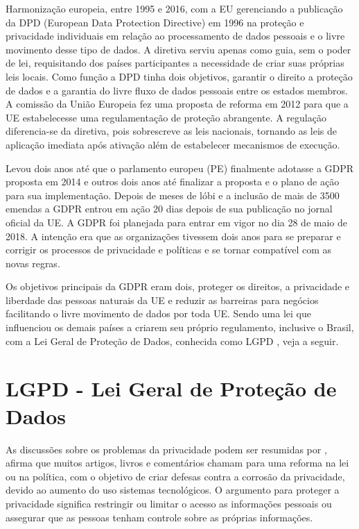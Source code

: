 Harmonização europeia, entre 1995 e 2016, com a EU gerenciando a publicação da DPD (European Data Protection Directive) em 1996 na proteção e privacidade individuais em relação ao processamento de dados pessoais e o livre movimento desse tipo de dados. A diretiva serviu apenas como guia, sem o poder de lei, requisitando dos países participantes a necessidade de criar suas próprias leis locais. Como função a DPD tinha dois objetivos, garantir o direito a proteção de dados e a garantia do livre fluxo de dados pessoais entre os estados membros. A comissão da União Europeia fez uma proposta de reforma em 2012 para que a UE estabelecesse uma regulamentação de proteção abrangente. A regulação diferencia-se da diretiva, pois sobrescreve as leis nacionais, tornando as leis de aplicação imediata após ativação além de estabelecer mecanismos de execução.

Levou dois anos até que o parlamento europeu (PE) finalmente adotasse a GDPR proposta em 2014 e outros dois anos até finalizar a proposta e o plano de ação para sua implementação. Depois de meses de lóbi e a inclusão de mais de 3500 emendas a GDPR entrou em ação 20 dias depois de sua publicação no jornal oficial da UE. A GDPR foi planejada para entrar em vigor no dia 28 de maio de 2018. A intenção era que as organizações tivessem dois anos para se preparar e corrigir os processos de privacidade e políticas e se tornar compatível com as novas regras.

Os objetivos principais da GDPR eram dois, proteger os direitos, a privacidade e liberdade das pessoas naturais da UE e reduzir as barreiras para negócios facilitando o livre movimento de dados por toda UE. Sendo uma lei que influenciou os demais países a criarem seu próprio regulamento, inclusive o Brasil, com a Lei Geral de Proteção de Dados, conhecida como LGPD \citep{candido_historico_2021}, veja a seguir. 


\section{LGPD - Lei Geral de Proteção de Dados}

As discussões sobre os problemas da privacidade podem ser resumidas por \citet{Nissenbaum+2009}, afirma que muitos artigos, livros e comentários chamam para uma reforma na lei ou na política, com o objetivo de criar defesas contra a corrosão da privacidade, devido ao aumento do uso sistemas tecnológicos. O argumento para proteger a privacidade significa restringir ou limitar o acesso as informações pessoais ou assegurar que as pessoas tenham controle sobre as próprias informações.

